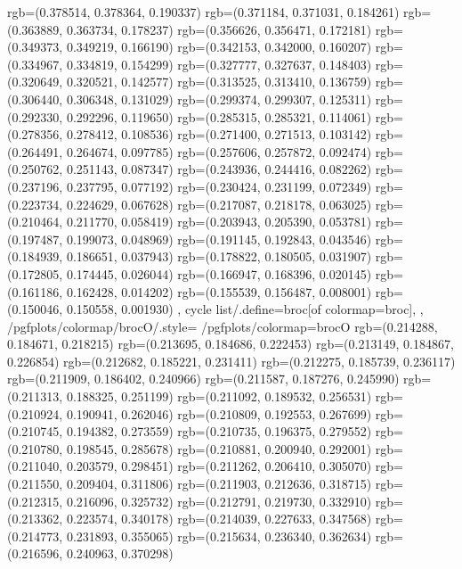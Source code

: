 {{{					rgb=(0.378514, 0.378364, 0.190337)
					rgb=(0.371184, 0.371031, 0.184261)
					rgb=(0.363889, 0.363734, 0.178237)
					rgb=(0.356626, 0.356471, 0.172181)
					rgb=(0.349373, 0.349219, 0.166190)
					rgb=(0.342153, 0.342000, 0.160207)
					rgb=(0.334967, 0.334819, 0.154299)
					rgb=(0.327777, 0.327637, 0.148403)
					rgb=(0.320649, 0.320521, 0.142577)
					rgb=(0.313525, 0.313410, 0.136759)
					rgb=(0.306440, 0.306348, 0.131029)
					rgb=(0.299374, 0.299307, 0.125311)
					rgb=(0.292330, 0.292296, 0.119650)
					rgb=(0.285315, 0.285321, 0.114061)
					rgb=(0.278356, 0.278412, 0.108536)
					rgb=(0.271400, 0.271513, 0.103142)
					rgb=(0.264491, 0.264674, 0.097785)
					rgb=(0.257606, 0.257872, 0.092474)
					rgb=(0.250762, 0.251143, 0.087347)
					rgb=(0.243936, 0.244416, 0.082262)
					rgb=(0.237196, 0.237795, 0.077192)
					rgb=(0.230424, 0.231199, 0.072349)
					rgb=(0.223734, 0.224629, 0.067628)
					rgb=(0.217087, 0.218178, 0.063025)
					rgb=(0.210464, 0.211770, 0.058419)
					rgb=(0.203943, 0.205390, 0.053781)
					rgb=(0.197487, 0.199073, 0.048969)
					rgb=(0.191145, 0.192843, 0.043546)
					rgb=(0.184939, 0.186651, 0.037943)
					rgb=(0.178822, 0.180505, 0.031907)
					rgb=(0.172805, 0.174445, 0.026044)
					rgb=(0.166947, 0.168396, 0.020145)
					rgb=(0.161186, 0.162428, 0.014202)
					rgb=(0.155539, 0.156487, 0.008001)
					rgb=(0.150046, 0.150558, 0.001930)
			},
		cycle list/.define={broc}{[of colormap=broc]},
		},
		/pgfplots/colormap/brocO/.style={
			/pgfplots/colormap={brocO}{%
					rgb=(0.214288, 0.184671, 0.218215)
					rgb=(0.213695, 0.184686, 0.222453)
					rgb=(0.213149, 0.184867, 0.226854)
					rgb=(0.212682, 0.185221, 0.231411)
					rgb=(0.212275, 0.185739, 0.236117)
					rgb=(0.211909, 0.186402, 0.240966)
					rgb=(0.211587, 0.187276, 0.245990)
					rgb=(0.211313, 0.188325, 0.251199)
					rgb=(0.211092, 0.189532, 0.256531)
					rgb=(0.210924, 0.190941, 0.262046)
					rgb=(0.210809, 0.192553, 0.267699)
					rgb=(0.210745, 0.194382, 0.273559)
					rgb=(0.210735, 0.196375, 0.279552)
					rgb=(0.210780, 0.198545, 0.285678)
					rgb=(0.210881, 0.200940, 0.292001)
					rgb=(0.211040, 0.203579, 0.298451)
					rgb=(0.211262, 0.206410, 0.305070)
					rgb=(0.211550, 0.209404, 0.311806)
					rgb=(0.211903, 0.212636, 0.318715)
					rgb=(0.212315, 0.216096, 0.325732)
					rgb=(0.212791, 0.219730, 0.332910)
					rgb=(0.213362, 0.223574, 0.340178)
					rgb=(0.214039, 0.227633, 0.347568)
					rgb=(0.214773, 0.231893, 0.355065)
					rgb=(0.215634, 0.236340, 0.362634)
					rgb=(0.216596, 0.240963, 0.370298)
}}}
